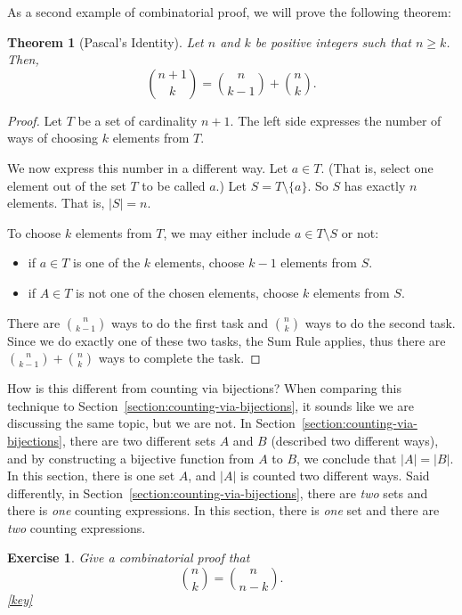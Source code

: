 \documentclass{book}
\newcounter{ekcounter}%
\theoremstyle{ekimcustom}
\newtheorem{theorem}[ekcounter]{Theorem}
\newtheorem{exercise}[ekcounter]{Exercise}
\begin{document}
As a second example of combinatorial proof, we will prove the following theorem:
\begin{theorem}[Pascal's Identity]
Let $n$ and $k$ be positive integers such that $n \geq k$. Then,
\[ \binom{n+1}{k} = \binom{n}{k-1} + \binom{n}{k}.\]
\end{theorem}
\begin{proof}
Let $T$ be a set of cardinality $n+1$. The left side expresses the number of ways of choosing $k$ elements from $T$.

We now express this number in a different way. Let $a \in T$. (That is, select one element out of the set $T$ to be called $a$.) Let $S = T \setminus \{a\}$. So $S$ has exactly $n$ elements. That is, $|S|=n$.

To choose $k$ elements from $T$, we may either include $a \in T \setminus S$ or not:
\begin{itemize}
\item if $a \in T$ is one of the $k$ elements, choose $k-1$ elements from $S$.
\item if $A \in T$ is not one of the chosen elements, choose $k$ elements from $S$.
\end{itemize}
There are $\binom{n}{k-1}$ ways to do the first task and $\binom{n}{k}$ ways to do the second task. Since we do exactly one of these two tasks, the Sum Rule applies, thus there are $\binom{n}{k-1} + \binom{n}{k}$ ways to complete the task.
\end{proof}

\begin{bremark}{How is this different from counting via bijections?}{}
When comparing this technique to Section~\ref{section:counting-via-bijections}, it sounds like we are discussing the same topic, but we are not. In Section~\ref{section:counting-via-bijections}, there are two different sets $A$ and $B$ (described two different ways), and by constructing a bijective function from $A$ to $B$, we conclude that $|A|=|B|$. In this section, there is one set $A$, and $|A|$ is counted two different ways.
\vskip6pt
Said differently, in Section~\ref{section:counting-via-bijections}, there are \emph{two} sets and there is \emph{one} counting expressions. In this section, there is \emph{one} set and there are \emph{two} counting expressions.
\end{bremark}

\begin{exercise}
Give a combinatorial proof that
\[ \binom{n}{k} = \binom{n}{n-k}.\]\quad\quad\href{https://www.sharelatex.com/read/mvgqwcbfmtzb}{{\color{red}[key]}}
\end{exercise}
\end{document}
